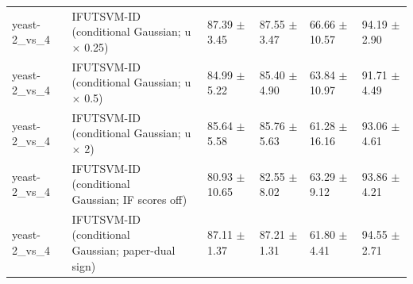 \begin{table}[!t]
{\begin{tabular}{llllll}
yeast-2\_vs\_4 & \shortstack[l]{IFUTSVM-ID (conditional\\Gaussian; u \(\times\) 0.25)} & 87.39 \(\pm\) 3.45 & 87.55 \(\pm\) 3.47 & 66.66 \(\pm\) 10.57 & 94.19 \(\pm\) 2.90 \\
yeast-2\_vs\_4 & \shortstack[l]{IFUTSVM-ID (conditional\\Gaussian; u \(\times\) 0.5)} & 84.99 \(\pm\) 5.22 & 85.40 \(\pm\) 4.90 & 63.84 \(\pm\) 10.97 & 91.71 \(\pm\) 4.49 \\
yeast-2\_vs\_4 & \shortstack[l]{IFUTSVM-ID (conditional\\Gaussian; u \(\times\) 2)} & 85.64 \(\pm\) 5.58 & 85.76 \(\pm\) 5.63 & 61.28 \(\pm\) 16.16 & 93.06 \(\pm\) 4.61 \\
yeast-2\_vs\_4 & \shortstack[l]{IFUTSVM-ID (conditional\\Gaussian; IF scores off)} & 80.93 \(\pm\) 10.65 & 82.55 \(\pm\) 8.02 & 63.29 \(\pm\) 9.12 & 93.86 \(\pm\) 4.21 \\
yeast-2\_vs\_4 & \shortstack[l]{IFUTSVM-ID (conditional\\Gaussian; paper-dual\\sign)} & 87.11 \(\pm\) 1.37 & 87.21 \(\pm\) 1.31 & 61.80 \(\pm\) 4.41 & 94.55 \(\pm\) 2.71 \\
\hline
\end{tabular}%
}
\end{table}


